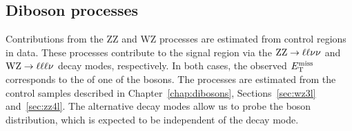 
\subsection{Diboson processes}
Contributions from the ZZ and WZ processes are estimated from control regions in data.
These processes contribute to the signal region via the
$\mathrm{Z}\mathrm{Z}\rightarrow\ell\ell\nu\nu$ and $\mathrm{W}\mathrm{Z}\rightarrow\ell\ell\ell\nu$ decay modes, respectively.
In both cases, the observed $E_\mathrm{T}^{\mathrm{miss}}$ corresponds to the \pt of one of the bosons.
The processes are estimated from the control samples described in Chapter~\ref{chap:dibosons}, Sections~\ref{sec:wz3l} and~\ref{sec:zz4l}. 
The alternative decay modes allow us to probe the boson \pt distribution, which is expected to be independent of the decay mode.

